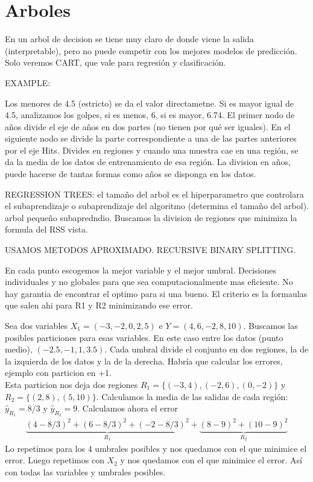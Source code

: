 \chapter{Arboles}\label{Chapter8} 


En un arbol de decision se tiene muy claro de donde viene la salida (interpretable), pero no puede competir con los mejores modelos de predicción. Solo veremos CART, que vale para regresión y clasificación.

EXAMPLE:

Los menores de 4.5 (estricto) se da el valor directametne. Si es mayor igual de 4.5, analizamos los golpes, si es menos, 6, si es mayor, 6.74. El primer nodo de años divide el eje de años en dos partes (no tienen por qué ser iguales). En el siguiente nodo se divide la parte correspondiente a una de las partes anteriores por el eje Hits. Divides en regiones y cuando una muestra cae en una región, se da la media de los datos de entrenamiento de esa región. La division en años, puede hacerse de tantas formas como años se disponga en los datos. 

REGRESSION TREES:
el tamaño del arbol es el hiperparametro que controlara el subaprendizaje o subaprendizaje del algoritmo (determina el tamaño del arbol). arbol pequeño subapredndio. Buscamos la division de regiones que minimiza la formula del RSS vista.

USAMOS METODOS APROXIMADO. RECURSIVE BINARY SPLITTING.

En cada punto escogemos la mejor variable y el mejor umbral. Decisiones individuales y no globales para que sea computacionalmente mas eficiente. No hay garantia de encontrar el optimo para si una bueno. El criterio es la formaulas que salen ahi para R1 y R2 minimizando ese error. 

\begin{example}
Sea dos variables $X_1 = (-3, -2, 0, 2, 5)$ e $Y = (4, 6, -2, 8, 10)$. Buscamos las posibles particiones para esas variables. En este caso entre los datos (punto medio), $(-2.5, -1, 1, 3.5)$. Cada umbral divide el conjunto en dos regiones, la de la izquierda de los datos y la de la derecha. Habría que calcular los errores, ejemplo con particion en +1. \\

Esta particion nos deja dos regiones $R_1 = \{(-3, 4), (-2, 6), (0, -2)\}$ y $R_2 = \{(2, 8), (5, 10)\}$. Calculamos la media de las salidas de cada región: $\hat{y}_{R_1} = 8/3$ y $\hat{y}_{R_2} = 9$. Calculamos ahora el error
\begin{align}
\underbrace{(4 - 8/3)^2 + (6 - 8/3)^2 + (-2 - 8/3)^2}_{R_1} + \underbrace{(8 - 9)^2 + (10 - 9)^2}_{R_2}
\end{align}
Lo repetimos para los 4 umbrales posibles y nos quedamos con el que minimice el error. Luego repetimos con $X_2$ y nos quedamos con el que minimice el error. Así con todas las variables y umbrales posibles.
\end{example}

